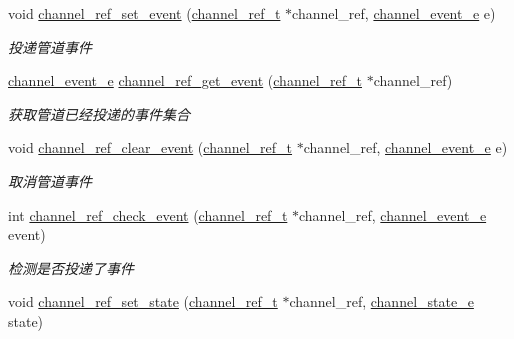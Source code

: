 \begin{DoxyCompactItemize}
void \hyperlink{a00045_aaa459c5e4bd63d343a31b5968a3ae5bd_aaa459c5e4bd63d343a31b5968a3ae5bd}{channel\+\_\+ref\+\_\+set\+\_\+event} (\hyperlink{a00047_a151271c9d188ef28d4d24bb81dcc1263_a151271c9d188ef28d4d24bb81dcc1263}{channel\+\_\+ref\+\_\+t} $\ast$channel\+\_\+ref, \hyperlink{a00047_a5ad43ab162fdf9ad53cde10ed3d87d99_a5ad43ab162fdf9ad53cde10ed3d87d99}{channel\+\_\+event\+\_\+e} e)
\begin{DoxyCompactList}\small\item\em 投递管道事件 \end{DoxyCompactList}\item 
\hyperlink{a00047_a5ad43ab162fdf9ad53cde10ed3d87d99_a5ad43ab162fdf9ad53cde10ed3d87d99}{channel\+\_\+event\+\_\+e} \hyperlink{a00045_ac24dbde77cfb71c60e1497dfe4cb49f3_ac24dbde77cfb71c60e1497dfe4cb49f3}{channel\+\_\+ref\+\_\+get\+\_\+event} (\hyperlink{a00047_a151271c9d188ef28d4d24bb81dcc1263_a151271c9d188ef28d4d24bb81dcc1263}{channel\+\_\+ref\+\_\+t} $\ast$channel\+\_\+ref)
\begin{DoxyCompactList}\small\item\em 获取管道已经投递的事件集合 \end{DoxyCompactList}\item 
void \hyperlink{a00045_a08e70ed62a98136a26d326e25d1dbeac_a08e70ed62a98136a26d326e25d1dbeac}{channel\+\_\+ref\+\_\+clear\+\_\+event} (\hyperlink{a00047_a151271c9d188ef28d4d24bb81dcc1263_a151271c9d188ef28d4d24bb81dcc1263}{channel\+\_\+ref\+\_\+t} $\ast$channel\+\_\+ref, \hyperlink{a00047_a5ad43ab162fdf9ad53cde10ed3d87d99_a5ad43ab162fdf9ad53cde10ed3d87d99}{channel\+\_\+event\+\_\+e} e)
\begin{DoxyCompactList}\small\item\em 取消管道事件 \end{DoxyCompactList}\item 
int \hyperlink{a00045_a7134a0dab5db76d26dac56924267e5ac_a7134a0dab5db76d26dac56924267e5ac}{channel\+\_\+ref\+\_\+check\+\_\+event} (\hyperlink{a00047_a151271c9d188ef28d4d24bb81dcc1263_a151271c9d188ef28d4d24bb81dcc1263}{channel\+\_\+ref\+\_\+t} $\ast$channel\+\_\+ref, \hyperlink{a00047_a5ad43ab162fdf9ad53cde10ed3d87d99_a5ad43ab162fdf9ad53cde10ed3d87d99}{channel\+\_\+event\+\_\+e} event)
\begin{DoxyCompactList}\small\item\em 检测是否投递了事件 \end{DoxyCompactList}\item 
void \hyperlink{a00045_a7e19561cc06440ebdf63ced5526c9e21_a7e19561cc06440ebdf63ced5526c9e21}{channel\+\_\+ref\+\_\+set\+\_\+state} (\hyperlink{a00047_a151271c9d188ef28d4d24bb81dcc1263_a151271c9d188ef28d4d24bb81dcc1263}{channel\+\_\+ref\+\_\+t} $\ast$channel\+\_\+ref, \hyperlink{a00047_a1956eea3012f780b5d592a9d09d9873c_a1956eea3012f780b5d592a9d09d9873c}{channel\+\_\+state\+\_\+e} state)

\end{DoxyCompactItemize}
